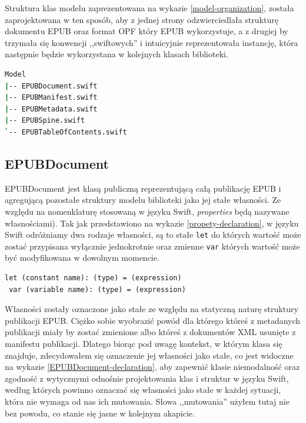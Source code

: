 Struktura klas modelu zaprezentowana na wykazie \ref{model-organization}, została zaprojektowana w ten sposób, aby z jednej strony odzwierciedlała strukturę dokumentu EPUB oraz format OPF który EPUB wykorzystuje, a z drugiej by trzymała się konwencji ,,swiftowych'' i intuicyjnie reprezentowała instancję, która następnie będzie wykorzystana w kolejnych klasach biblioteki.

\begin{lstlisting}[caption={Struktura modelu EPUBKit}, language=bash,label=model-organization]
Model
|-- EPUBDocument.swift
|-- EPUBManifest.swift
|-- EPUBMetadata.swift
|-- EPUBSpine.swift
`-- EPUBTableOfContents.swift
\end{lstlisting}

\subsection{EPUBDocument}
\label{EPUBDocument}

EPUBDocument jest klasą publiczną reprezentującą całą publikację EPUB i agregującą pozostałe struktury modelu biblioteki jako jej stałe własności. Ze względu na nomenklaturę stosowaną w języku Swift, \textit{properties} będą nazywane własnościami). Tak jak przedstawiono na wykazie \ref{propety-declaration}, w języku Swift odróżniamy dwa rodzaje własności, są to stałe \texttt{let} do których wartość może zostać przypisana wyłącznie jednokrotnie oraz zmienne \texttt{var} których wartość może być modyfikowana w dowolnym momencie.

\begin{lstlisting}[caption={Deklaracje własności w Swifcie.\cite{theSwiftProgrammingLanguageDeclarations}}, language=swift-reference,label=propety-declaration]
 let (constant name): (type) = (expression)
 var (variable name): (type) = (expression)
\end{lstlisting}

Własności zostały oznaczone jako stałe ze względu na statyczną naturę struktury publikacji EPUB. Ciężko sobie wyobrazić powód dla którego któreś z metadanych publikacji miały by zostać zmienione albo któreś z dokumentów XML usunięte z manifestu publikacji. Dlatego biorąc pod uwagę kontekst, w którym klasa się znajduje, zdecydowałem się oznaczenie jej własności jako stałe, co jest widoczne na wykazie \ref{EPUBDocument-declaration}, aby zapewnić klasie niemodalność oraz zgodność z wytycznymi odnośnie projektowania klas i struktur w języku Swift, według których powinno oznaczać się własności jako stałe w każdej sytuacji, która nie wymaga od nas ich mutowania. Słowa ,,mutowania'' użyłem tutaj nie bez powodu, co stanie się jasne w kolejnym akapicie.


